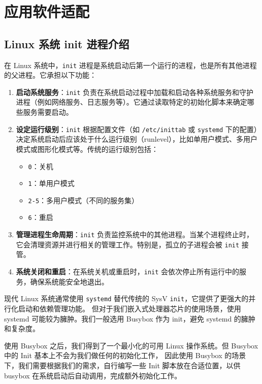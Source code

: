 
\chapter{应用软件适配}\label{chap:14-software}

\section{Linux 系统 init 进程介绍}\label{sec:14-software-001}

在 Linux 系统中，\texttt{init} 进程是系统启动后第一个运行的进程，也是所有其他进程的父进程。它承担以下功能：

\begin{enumerate}
\item \textbf{启动系统服务}：\texttt{init} 负责在系统启动过程中加载和启动各种系统服务和守护进程（例如网络服务、日志服务等）。它通过读取特定的初始化脚本来确定哪些服务需要启动。
\item \textbf{设定运行级别}：\texttt{init} 根据配置文件（如 \texttt{/etc/inittab} 或 \texttt{systemd} 下的配置）决定系统启动后应该处于什么运行级别（runlevel），比如单用户模式、多用户模式或图形化模式等。传统的运行级别包括：
\begin{itemize}
\item \texttt{0}：关机
\item \texttt{1}：单用户模式
\item \texttt{2-5}：多用户模式（不同的服务集）
\item \texttt{6}：重启
\end{itemize}
\item \textbf{管理进程生命周期}：\texttt{init} 负责监控系统中的其他进程。当某个进程终止时，它会清理资源并进行相关的管理工作。特别是，孤立的子进程会被 \texttt{init} 接管。
\item \textbf{系统关闭和重启}：在系统关机或重启时，\texttt{init} 会依次停止所有运行中的服务，确保系统能安全地退出。
\end{enumerate}


现代 Linux 系统通常使用 \texttt{systemd} 替代传统的 SysV \texttt{init}，它提供了更强大的并行化启动和依赖管理功能。
但对于我们嵌入式处理器芯片的使用场景，使用 systemd 可能较为臃肿。我们一般选用 Busybox 作为 init，避免 systemd 的臃肿和复杂度。

使用 Busybox 之后，我们得到了一个最小化的可用 Linux 操作系统。但 Busybox 中的 Init 基本上不会为我们做任何的初始化工作，
因此使用 Busybox 的场景下，我们需要根据我们的需求，自行编写一些 Init 脚本放在合适位置，以供 busybox 在系统启动后自动调用，完成额外初始化工作。

